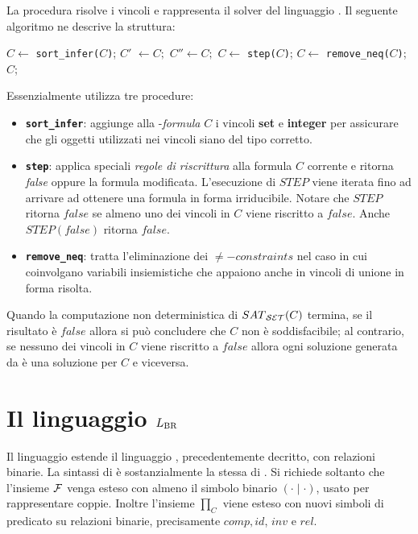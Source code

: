 \documentclass[12pt,a4paper,openright]{book} %
\begin{document}
La procedura \satset{} risolve i vincoli e rappresenta il solver del linguaggio \clpset{}. Il seguente algoritmo ne descrive la struttura:

\begin{algorithm}
\begin{algorithmic}[1]
\Procedure{\satset{}}{}
\State $C \gets $ \texttt{sort\_infer($C$)};
\Repeat
\State $C'$ $\gets C;$
\Repeat
\State $C'' \gets C;$
\State $C \gets $ \texttt{step($C$)};
\State $C \gets $ \texttt{remove\_neq($C$)};
\State
\State\Return $C$;
\EndProcedure
\end{algorithmic}
\end{algorithm}

Essenzialmente \satset{} utilizza tre procedure:

\begin{itemize}
\item \textbf{\texttt{sort\_infer}}: aggiunge alla \lset{}-\textit{formula} $C$ i vincoli \textbf{set} e \textbf{integer} per assicurare che gli oggetti utilizzati nei vincoli siano del tipo corretto.
    
\item \textbf{\texttt{step}}: applica speciali \textit{regole di riscrittura} alla formula $C$ corrente e ritorna \textit{false} oppure la formula modificata. L'esecuzione di $STEP$ viene iterata fino ad arrivare ad ottenere una formula in forma irriducibile. Notare che $STEP$ ritorna $false$ se almeno uno dei vincoli in $C$ viene riscritto a $false$. Anche $STEP(false)$ ritorna $false$.
    
\item \textbf{\texttt{remove\_neq}}: tratta l'eliminazione dei $\neq-constraints$ nel caso in cui coinvolgano variabili insiemistiche che appaiono anche in vincoli di unione in forma risolta.
\end{itemize}

Quando la computazione non deterministica di $SAT\textsubscript{\ensuremath{\mathcal{S}}\ensuremath{\mathcal{E}}\ensuremath{\mathcal{T}}}{}(C)$ termina, se il risultato è $false$ allora si può concludere che $C$ non è soddisfacibile; al contrario, se nessuno dei vincoli in $C$ viene riscritto a $false$ allora ogni soluzione generata da \satset{} è una soluzione per $C$ e viceversa.

\section{Il linguaggio $L\textsubscript{BR}$}
\label{sec:lang_lbr}

Il linguaggio \lbr{} estende il linguaggio \clpset{}, precedentemente decritto, con relazioni binarie.
La sintassi di \lbr{} è sostanzialmente la stessa di \clpset{}.
Si richiede soltanto che l'insieme $\mathcal{F}$ venga esteso con almeno il simbolo binario $(\cdot \mid \cdot)$, usato per rappresentare coppie.
Inoltre l'insieme $\prod_C$ viene esteso con nuovi simboli di predicato su relazioni binarie, precisamente $comp, id$, $inv$ e $rel$.
\end{document}
